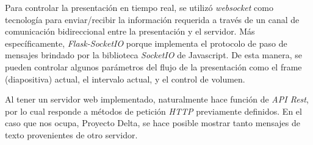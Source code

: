		Para controlar la presentación en tiempo real, se utilizó \textit{websocket} como tecnología para enviar/recibir la información requerida a través de un canal de comunicación bidireccional entre la presentación y el servidor. Más específicamente, \textit{Flask-SocketIO} porque implementa el protocolo de paso de mensajes brindado por la biblioteca \textit{SocketIO} de Javascript. De esta manera, se pueden controlar algunos parámetros del flujo de la presentación como el frame (diapositiva) actual, el intervalo actual, y el control de volumen.

		Al tener un servidor web implementado, naturalmente hace función de \textit{API Rest}, por lo cual responde a métodos de petición \textit{HTTP} previamente definidos. En el caso que nos ocupa, Proyecto Delta, se hace posible mostrar tanto mensajes de texto provenientes de otro servidor.	





